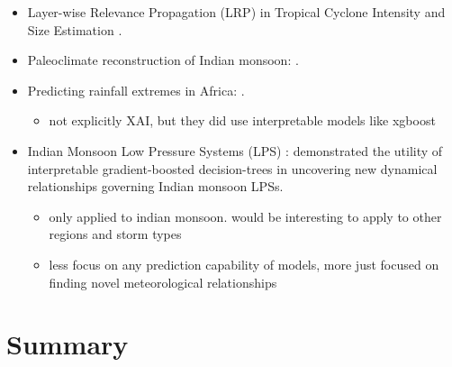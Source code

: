 \begin{itemize}
    \item Layer-wise Relevance Propagation (LRP) in Tropical Cyclone Intensity and Size Estimation .
    \item Paleoclimate reconstruction of Indian monsoon: .
    \item Predicting rainfall extremes in Africa: .
    \begin{itemize}
        \item not explicitly XAI, but they did use interpretable models like xgboost
    \end{itemize}
    \item Indian Monsoon Low Pressure Systems (LPS) : \cite{Hunt2024} demonstrated the utility of interpretable gradient-boosted decision-trees in uncovering new dynamical relationships governing Indian monsoon LPSs.
    \begin{itemize}
        \item only applied to indian monsoon. would be interesting to apply to other regions and storm types
        \item less focus on any prediction capability of models, more just focused on finding novel meteorological relationships
    \end{itemize} 
\end{itemize}

\section{Summary}
